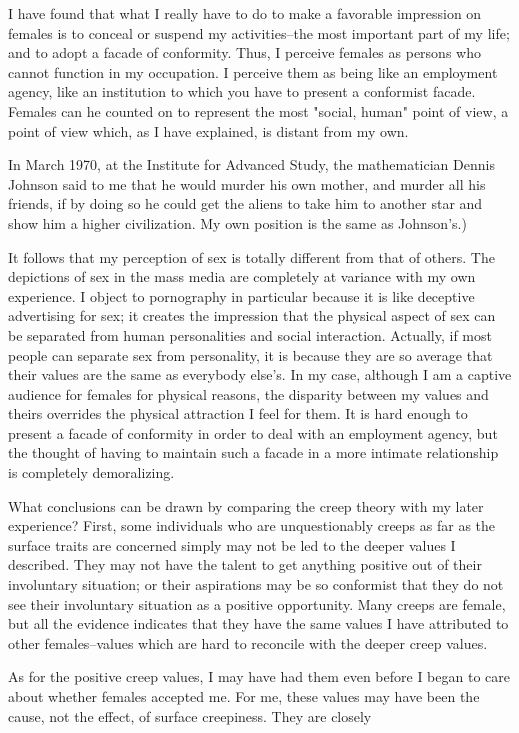 \documentclass[10pt,twoside]{memoir}
\begin{document}
\begin{enumerate}
{\begin{enumerate}
\begin{sysrules}
\begin{sysrules}
\begin{sysrules}
\begin{sysrules}
{\begin{enumerate}
{{{{{{{I have found that what I really have to do to make a favorable 
impression on females is to conceal or suspend my activities--the most 
important part of my life; and to adopt a facade of conformity. Thus, I 
perceive females as persons who cannot function in my occupation. I 
perceive them as being like an employment agency, like an institution to 
which you have to present a conformist facade. Females can he counted on to 
represent the most "social, human" point of view, a point of view which, as I 
have explained, is distant from my own. {In March 1970, at the Institute for 
Advanced Study, the mathematician Dennis Johnson said to me that he 
would murder his own mother, and murder all his friends, if by doing so he 
could get the aliens to take him to another star and show him a higher 
civilization. My own position is the same as Johnson's.) 

It follows that my perception of sex is totally different from that of 
others. The depictions of sex in the mass media are completely at variance 
with my own experience. I object to pornography in particular because it is 
like deceptive advertising for sex; it creates the impression that the physical 
aspect of sex can be separated from human personalities and social 
interaction. Actually, if most people can separate sex from personality, it is 
because they are so average that their values are the same as everybody else's. 
In my case, although I am a captive audience for females for physical 
reasons, the disparity between my values and theirs overrides the physical 
attraction I feel for them. It is hard enough to present a facade of 
conformity in order to deal with an employment agency, but the thought of 
having to maintain such a facade in a more intimate relationship is 
completely demoralizing. 

What conclusions can be drawn by comparing the creep theory with my 
later experience? First, some individuals who are unquestionably creeps as 
far as the surface traits are concerned simply may not be led to the deeper 
values I described. They may not have the talent to get anything positive out 
of their involuntary situation; or their aspirations may be so conformist that 
they do not see their involuntary situation as a positive opportunity. Many 
creeps are female, but all the evidence indicates that they have the same 
values I have attributed to other females--values which are hard to reconcile 
with the deeper creep values. 

As for the positive creep values, I may have had them even before I 
began to care about whether females accepted me. For me, these values may 
have been the cause, not the effect, of surface creepiness. They are closely 


}}}}}}}}
\end{enumerate}}
\end{sysrules}
\end{sysrules}
\end{sysrules}
\end{sysrules}
\end{enumerate}}
\end{enumerate}
\end{document}
